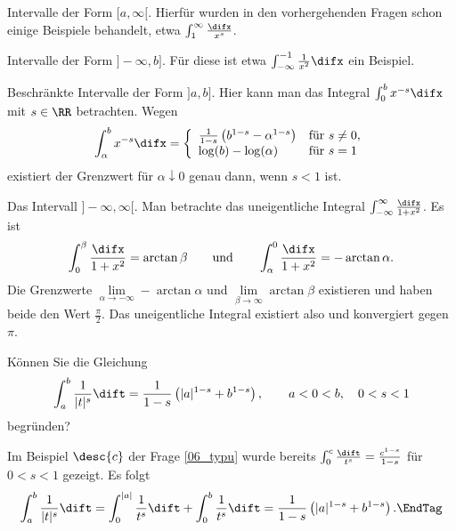   \begin{antwort}
    Intervalle der Form $[a,\infty[$. Hierfür wurden in den 
    vorhergehenden Fragen schon einige Beispiele behandelt,
    etwa $\int_1^\infty \frac{\difx}{x^s}$. 

    \medskip
    \noindent
     Intervalle der Form $]-\infty,b]$. Für diese 
    ist etwa $\int_{-\infty}^{-1} \frac{1}{x^2} \difx$ 
    ein Beispiel.  

    \medskip
    \noindent
     Beschränkte Intervalle der Form $]a,b]$. Hier kann man das 
    Integral $\int_0^b x^{-s} \difx$ mit $s\in \RR$ betrachten. 
    Wegen 
    \[
    \int_\alpha^b x^{-s}\difx = \left\{ 
      \begin{array}{ll}
        \frac{1}{1-s}\left(  b^{1-s} - \alpha^{1-s} \right) & \text{für $s\not=0$},
        \\
        \log (b) - \log(\alpha) & \text{für $s=1$}
      \end{array} \right. 
    \]
    existiert der Grenzwert für $\alpha \downarrow 0$ genau dann, wenn 
    $s<1$ ist. 

    \medskip
    \noindent
     Das Intervall $]-\infty,\infty[$. Man betrachte das 
    uneigentliche Integral $\int_{-\infty}^\infty \frac{\difx}{1+x^2}$. 
    Es ist 
    \[
    \int_0^\beta \frac{\difx}{1+x^2} = \arctan \beta \qquad\text{und}\qquad 
    \int_\alpha^0 \frac{\difx}{1+x^2} = -\arctan \alpha.
    \]
    Die Grenzwerte $\lim\limits_{\alpha\to- \infty} - \arctan \alpha$ und 
    $\lim\limits_{\beta\to\infty} \arctan \beta$ existieren und haben beide  
    den Wert $\frac{\pi}{2}$. Das uneigentliche Integral existiert 
    also und konvergiert gegen $\pi$. \AntEnd
  \end{antwort}

  \begin{frage}
    Können Sie die Gleichung 
    \[
    \int_a^b \frac{1}{|t|^s} \dift = 
    \frac{1}{1-s} \left( |a|^{1-s} + b^{1-s} \right), \qquad 
    a<0<b, \quad 0<s<1
    \]
    begründen?
  \end{frage}

  \begin{antwort}
    Im Beispiel $\desc{c}$ der Frage \ref{06_typu} wurde bereits
    $\int_0^c \frac{\dift}{t^s}=\frac{c^{1-s}}{1-s}$ für $0<s<1$ gezeigt. 
    Es folgt 
    \begin{equation}
      \int_a^b \frac{1}{|t|^s} \dift= 
      \int_0^{|a|} \frac{1}{t^s} \dift+ 
      \int_0^{b} \frac{1}{t^s} \dift= 
      \frac{1}{1-s}\left( |a|^{1-s} + b^{1-s} \right). 
      \EndTag
    \end{equation} 
  \end{antwort}

